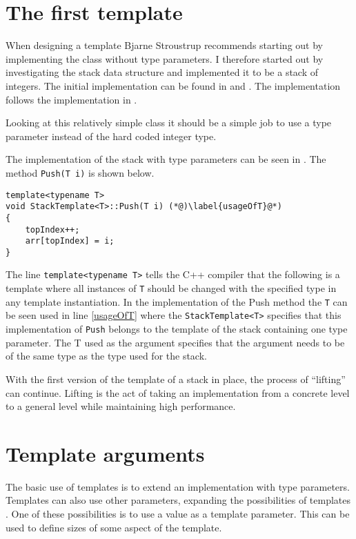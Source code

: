 \section{The first template}
When designing a template Bjarne Stroustrup recommends starting out by implementing the class without type parameters\cite[p.~670]{stroustrup2013c++}. 
I therefore started out by investigating the stack data structure and implemented it to be a stack of integers.
The initial implementation can be found in  and .
The implementation follows the implementation in \citet[232]{algo}.

Looking at this relatively simple class it should be a simple job to use a type parameter instead of the hard coded integer type.

The implementation of the stack with type parameters can be seen in .
The method \lstinline!Push(T i)! is shown below.

\begin{lstlisting}
template<typename T>
void StackTemplate<T>::Push(T i) (*@)\label{usageOfT}@*)
{
	topIndex++;
	arr[topIndex] = i;
}
\end{lstlisting}

The line \lstinline|template<typename T>| tells the C++ compiler that the following is a template where all instances of \texttt{T} should be changed with the specified type in any template instantiation.
In the implementation of the Push method the \texttt{T} can be seen used in line \ref{usageOfT} where the \lstinline|StackTemplate<T>| specifies that this implementation of \lstinline!Push! belongs to the template of the stack containing one type parameter.
The T used as the argument specifies that the argument needs to be of the same type as the type used for the stack. 

With the first version of the template of a stack in place, the process of ``lifting'' can continue. 
Lifting is the act of taking an implementation from a concrete level to a general level while maintaining high performance\cite[p.~700]{stroustrup2013c++}.

\section{Template arguments}
The basic use of templates is to extend an implementation with type parameters.
Templates can also use other parameters, expanding the possibilities of templates \cite[p.~722]{stroustrup2013c++}.
One of these possibilities is to use a value as a template parameter.
This can be used to define sizes of some aspect of the template. \cite[p.~724]{stroustrup2013c++}

